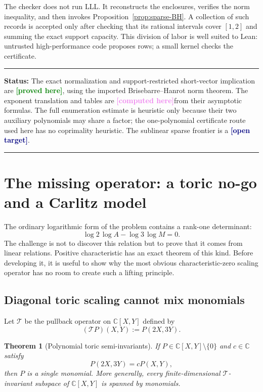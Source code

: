\documentclass[11pt,oneside]{article}
\newtheorem{theorem}{Theorem}[section]
\theoremstyle{definition}
\theoremstyle{remark}
\newcommand{\C}{\mathbb C}
\newcommand{\cT}{\mathcal T}
\newcommand{\statusproved}{\textcolor{green}{\textbf{[proved here]}}}
\newcommand{\statuscomputed}{\textcolor{violet}{\textbf{[computed here]}}}
\newcommand{\statustarget}{\textcolor{navy}{\textbf{[open target]}}}
\newenvironment{statusbox}[1]
{\begin{center}\begin{minipage}{0.95\textwidth}\raggedright\hrule
\vspace{0.45em}\textbf{Status:} #1\par\vspace{0.35em}}
{\vspace{0.35em}\hrule\end{minipage}\end{center}}
\begin{document}
The checker does not run LLL.  It reconstructs the enclosures, verifies the norm inequality, and
then invokes Proposition~\ref{prop:sparse-BH}.  A collection of such records is accepted only after
checking that its rational intervals cover $[1,2]$ and summing the exact support capacity.
This division of labor is well suited to Lean: untrusted high-performance code proposes rows;
a small kernel checks the certificate.

\begin{statusbox}{The exact normalization and support-restricted short-vector implication are
\statusproved, using the imported Brisebarre--Hanrot norm theorem.  The exponent translation and
tables are \statuscomputed from their asymptotic formulas.  The full enumeration estimate is
heuristic only because their two auxiliary polynomials may share a factor; the one-polynomial
certificate route used here has no coprimality heuristic.  The sublinear sparse frontier is a
\statustarget.}
\end{statusbox}

\section{The missing operator: a toric no-go and a Carlitz model}
\label{sec:operator}

The ordinary logarithmic form of the problem contains a rank-one determinant:
\[
  \log2\,\log A-\log3\,\log M=0.
\]
The challenge is not to discover this relation but to prove that it comes from linear relations.
Positive characteristic has an exact theorem of this kind.  Before developing it, it is useful to
show why the most obvious characteristic-zero scaling operator has no room to create such a
lifting principle.

\subsection{Diagonal toric scaling cannot mix monomials}

Let $\cT$ be the pullback operator on $\C[X,Y]$ defined by
\[
  (\cT P)(X,Y):=P(2X,3Y).
\]

\begin{theorem}[Polynomial toric semi-invariants]
\label{thm:toric-semi-invariant}
If $P\in\C[X,Y]\setminus\{0\}$ and $c\in\C$ satisfy
\[
  P(2X,3Y)=cP(X,Y),
\]
then $P$ is a single monomial.  More generally, every finite-dimensional $\cT$-invariant subspace
of $\C[X,Y]$ is spanned by monomials.
\end{theorem}
\end{document}
